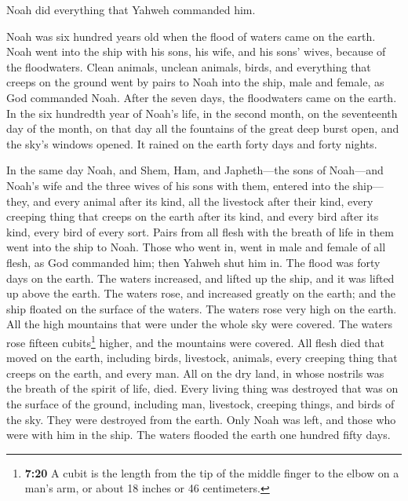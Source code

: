  Noah did everything that Yahweh commanded him.

 Noah was six hundred years old when the flood of waters
came on the earth.  Noah went into the ship with his sons,
his wife, and his sons' wives, because of the floodwaters.
 Clean animals, unclean animals, birds, and everything
that creeps on the ground  went by pairs to Noah into the
ship, male and female, as God commanded Noah.  After the
seven days, the floodwaters came on the earth.  In the
six hundredth year of Noah's life, in the second month, on the
seventeenth day of the month, on that day all the fountains of the great
deep burst open, and the sky's windows opened.  It rained
on the earth forty days and forty nights.

 In the same day Noah, and Shem, Ham, and Japheth---the
sons of Noah---and Noah's wife and the three wives of his sons with
them, entered into the ship---  they, and every animal
after its kind, all the livestock after their kind, every creeping thing
that creeps on the earth after its kind, and every bird after its kind,
every bird of every sort.  Pairs from all flesh with the
breath of life in them went into the ship to Noah.  Those
who went in, went in male and female of all flesh, as God commanded him;
then Yahweh shut him in.  The flood was forty days on the
earth. The waters increased, and lifted up the ship, and it was lifted
up above the earth.  The waters rose, and increased
greatly on the earth; and the ship floated on the surface of the waters.
 The waters rose very high on the earth. All the high
mountains that were under the whole sky were covered. 
The waters rose fifteen cubits\footnote{\textbf{7:20} A cubit is the
  length from the tip of the middle finger to the elbow on a man's arm,
  or about 18 inches or 46 centimeters.} higher, and the mountains were
covered.  All flesh died that moved on the earth,
including birds, livestock, animals, every creeping thing that creeps on
the earth, and every man.  All on the dry land, in whose
nostrils was the breath of the spirit of life, died. 
Every living thing was destroyed that was on the surface of the ground,
including man, livestock, creeping things, and birds of the sky. They
were destroyed from the earth. Only Noah was left, and those who were
with him in the ship.  The waters flooded the earth one
hundred fifty days.

